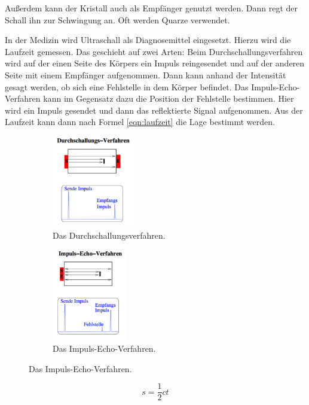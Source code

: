 Außerdem kann der Kristall auch als Empfänger genutzt werden. Dann regt der Schall ihn zur Schwingung an.
Oft werden Quarze verwendet.

In der Medizin wird Ultraschall als Diagnosemittel eingesetzt. Hierzu wird die Laufzeit gemessen.
Das geschieht auf zwei Arten:
Beim Durchschallungsverfahren wird auf der einen Seite des Körpers ein Impuls reingesendet
und auf der anderen Seite mit einem Empfänger aufgenommen. Dann kann anhand der Intensität
gesagt werden, ob sich eine Fehlstelle in dem Körper befindet.
Das Impuls-Echo-Verfahren kann im Gegensatz dazu die Position der Fehlstelle bestimmen.
Hier wird ein Impuls gesendet und dann das reflektierte Signal aufgenommen. Aus
der Laufzeit kann dann nach Formel \eqref{eqn:laufzeit} die Lage bestimmt werden.

\begin{figure}
  \centering
  \begin{subfigure}{0.48\textwidth}
    \centering
    \includegraphics[height=4cm]{Pics/durchschall.pdf}
    \caption{Das Durchschallungsverfahren.}
    \label{fig:durchschall}
  \end{subfigure}
  \begin{subfigure}{0.48\textwidth}
    \centering
    \includegraphics[height=4cm]{Pics/Impuls-Echo.pdf}
    \caption{Das Impuls-Echo-Verfahren.}
    \label{fig:impuls_echo}
  \end{subfigure}
\end{figure}

\begin{equation}
  s = \frac{1}{2} c t
  \label{eqn:laufzeit}
\end{equation}

